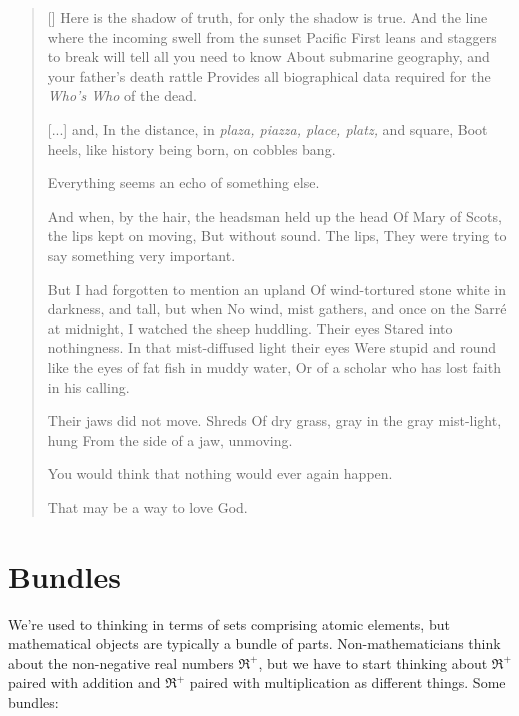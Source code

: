 \documentclass[11pt]{article}
\begin{document}
\begin{verse}[\versewidth]
Here is the shadow of truth, for only the shadow is true.
And the line where the incoming swell from the sunset Pacific
First leans and staggers to break will tell all you need to know
About submarine geography, and your father’s death rattle
Provides all biographical data required for the {\em Who's Who} of the dead.

[...] and,
In the distance, in {\em plaza, piazza, place, platz,} and square,
Boot heels, like history being born, on cobbles bang.

Everything seems an echo of something else.

And when, by the hair, the headsman held up the head
Of Mary of Scots, the lips kept on moving,
But without sound.  The lips,
They were trying to say something very important.

But I had forgotten to mention an upland
Of wind-tortured stone white in darkness, and tall, but when
No wind, mist gathers, and once on the Sarré at midnight,
I watched the sheep huddling.  Their eyes
Stared into nothingness.  In that mist-diffused light their eyes
Were stupid and round like the eyes of fat fish in muddy water,
Or of a scholar who has lost faith in his calling.

Their jaws did not move.  Shreds
Of dry grass, gray in the gray mist-light, hung
From the side of a jaw, unmoving.

You would think that nothing would ever again happen.

That may be a way to love God.
\end{verse}

\section{Bundles}\label{bundlesec}
We're used to thinking in terms of sets comprising atomic elements, but mathematical
objects are typically a bundle of parts. Non-mathematicians think about the non-negative real numbers
$\Re^+$, but we have to start thinking about $\Re^+$ paired with addition and $\Re^+$
paired with multiplication as different things. Some bundles:

\end{document}
